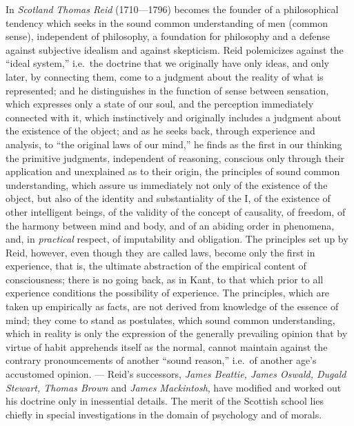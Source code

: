In \emph{Scotland} \emph{Thomas Reid} (1710---1796) becomes the founder of a philosophical tendency
which seeks in the sound common understanding of men (common sense), independent of philosophy, a
foundation for philosophy and a defense against subjective idealism and against skepticism. Reid
polemicizes against the ``ideal system,'' i.e.\ the doctrine that we originally have only ideas,
and only later, by connecting them, come to a judgment about the reality of what is represented;
and he distinguishes in the function of sense between sensation, which expresses only a state of our
soul, and the perception immediately connected with it, which instinctively and originally includes
a judgment about the existence of the object; and as he seeks back, through experience and
analysis, to ``the original laws of our mind,'' he finds as the first in our thinking the primitive
judgments, independent of reasoning, conscious only through their application and unexplained as to
their origin, the principles of sound common understanding, which assure us immediately not only of
the existence of the object, but also of the identity and substantiality of the I, of the existence
of other intelligent beings, of the validity of the concept of causality, of freedom, of the
harmony between mind and body, and of an abiding order in phenomena, and, in \emph{practical}
respect, of imputability and obligation.
The principles set up by Reid, however, even though they are called laws, become only
the first in experience, that is, the ultimate abstraction of the empirical content of
consciousness; there is no going back, as in Kant, to that which prior to all experience conditions
the possibility of experience. The principles, which are taken up empirically as facts, are not
derived from knowledge of the essence of mind; they come to stand as postulates, which sound common
understanding, which in reality is only the expression of the generally prevailing opinion that by
virtue of habit apprehends itself as the normal, cannot maintain against the contrary pronouncements
of another ``sound reason,'' i.e.\ of another age's accustomed opinion. --- Reid's successors,
\emph{James Beattie, James Oswald, Dugald Stewart, Thomas Brown} and \emph{James Mackintosh}, have
modified and worked out his doctrine only in inessential details. The merit of the Scottish school
lies chiefly in special investigations in the domain of psychology and of morals.

\divrule

